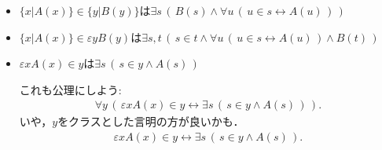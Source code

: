 \begin{itemize}
\begin{align}
				\forall u\, \left(\, u \in s \leftrightarrow A(u)\, \right)\, \right)
			\end{align}
			が成り立っているとして，
			\begin{align}
				\sigma = \varepsilon s\, \left(\, s \in \eta \wedge 
				\forall u\, \left(\, u \in s \leftrightarrow A(u)\, \right)\, \right)
			\end{align}
			としよう．すると
			\begin{align}
				\sigma \in \eta \wedge 
				\forall u\, \left(\, u \in \sigma \leftrightarrow A(u)\, \right)
			\end{align}
			が成り立つので
			\begin{align}
				\sigma \in \eta
			\end{align}
			かつ
			\begin{align}
				\sigma = \{x|A(x)\}
			\end{align}
			が成立する．ゆえに
			\begin{align}
				\{x|A(x)\} \in \eta
			\end{align}
			が成立する．以上で
			\begin{align}
				\{x|A(x)\} \in \eta \leftrightarrow
				\exists s\, \left(\, s \in \eta \wedge 
				\forall u\, \left(\, u \in s \leftrightarrow A(u)\, \right)\, \right)
			\end{align}
			が得られた．
			
		\item $\{x|A(x)\} \in \{y|B(y)\}$は$\exists s\, \left(\, B(s) \wedge 
			\forall u\, \left(\, u \in s \leftrightarrow A(u)\, \right)\, \right)$
		
		\item $\{x|A(x)\} \in \varepsilon y B(y)$は$\exists s,t\, \left(\, s \in t \wedge 
			\forall u\, \left(\, u \in s \leftrightarrow A(u)\, \right) \wedge B(t)\, \right)$
		
		\item $\varepsilon x A(x) \in y$は$\exists s\, \left(\, s \in y \wedge A(s)\, \right)$
			
			これも公理にしよう:
			\begin{align}
				\forall y\, \left(\, \varepsilon x A(x) \in y \leftrightarrow
				\exists s\, \left(\, s \in y \wedge A(s)\, \right)\, \right).
			\end{align}
			いや，$y$をクラスとした言明の方が良いかも．
			\begin{align}
				\varepsilon x A(x) \in y \leftrightarrow
				\exists s\, \left(\, s \in y \wedge A(s)\, \right).
			\end{align}
		

\end{itemize}
